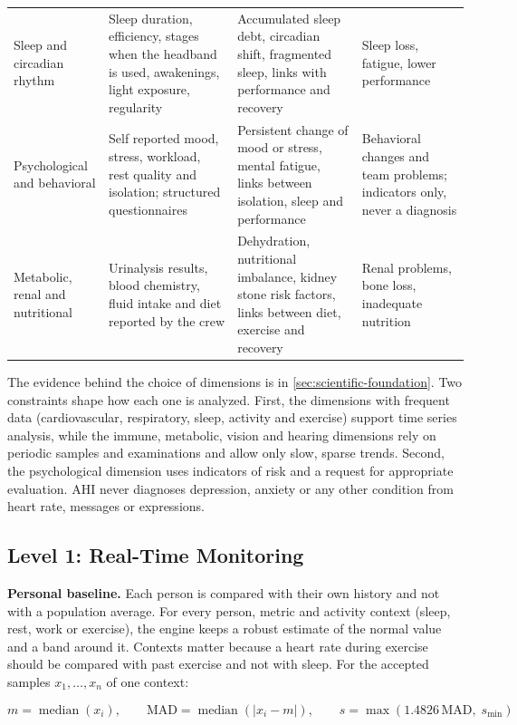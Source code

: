 \begin{table}[htbp]
\begin{tabular}{p{2.3cm}p{4.0cm}p{4.2cm}p{3.5cm}}
Sleep and circadian rhythm & Sleep duration, efficiency, stages when the headband is used, awakenings, light exposure, regularity & Accumulated sleep debt, circadian shift, fragmented sleep, links with performance and recovery & Sleep loss, fatigue, lower performance \\
Psychological and behavioral & Self reported mood, stress, workload, rest quality and isolation; structured questionnaires & Persistent change of mood or stress, mental fatigue, links between isolation, sleep and performance & Behavioral changes and team problems; indicators only, never a diagnosis \\
Metabolic, renal and nutritional & Urinalysis results, blood chemistry, fluid intake and diet reported by the crew & Dehydration, nutritional imbalance, kidney stone risk factors, links between diet, exercise and recovery & Renal problems, bone loss, inadequate nutrition \\
\hline
\end{tabular}
\vspace{1.2em}
\end{table}

The evidence behind the choice of dimensions is in \ref{sec:scientific-foundation}. Two constraints shape how each one is analyzed. First, the dimensions with frequent data (cardiovascular, respiratory, sleep, activity and exercise) support time series analysis, while the immune, metabolic, vision and hearing dimensions rely on periodic samples and examinations and allow only slow, sparse trends. Second, the psychological dimension uses indicators of risk and a request for appropriate evaluation. AHI never diagnoses depression, anxiety or any other condition from heart rate, messages or expressions.

\subsection{Level 1: Real-Time Monitoring}
\label{subsec:baseline}

\medskip\noindent\textbf{Personal baseline.} Each person is compared with their own history and not with a population average. For every person, metric and activity context (sleep, rest, work or exercise), the engine keeps a robust estimate of the normal value and a band around it. Contexts matter because a heart rate during exercise should be compared with past exercise and not with sleep. For the accepted samples $x_1,\dots,x_n$ of one context:

\begin{equation}
m=\operatorname{median}(x_i),\qquad \mathrm{MAD}=\operatorname{median}\left(\lvert x_i-m\rvert\right),\qquad s=\max\left(1.4826\,\mathrm{MAD},\;s_{\min}\right)
\end{equation}

